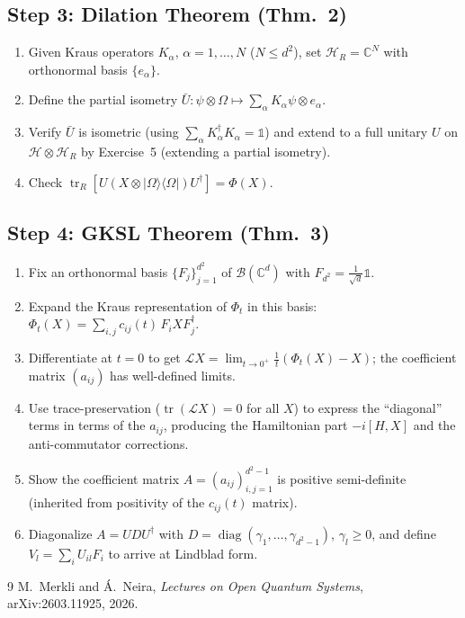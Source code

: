 \documentclass[11pt,a4paper]{article}
\begin{document}
\subsection*{Step 3: Dilation Theorem (Thm.~2)}
\begin{enumerate}[nosep]
  \item Given Kraus operators $K_\alpha$, $\alpha = 1,\dots,N$ ($N \le d^2$), set $\mathcal{H}_R = \mathbb{C}^N$ with orthonormal basis $\{e_\alpha\}$.
  \item Define the partial isometry $\bar{U}: \psi\otimes\Omega \mapsto \sum_\alpha K_\alpha\psi \otimes e_\alpha$.
  \item Verify $\bar{U}$ is isometric (using $\sum_\alpha K_\alpha^\dagger K_\alpha = \mathbb{1}$) and extend to a full unitary $U$ on $\mathcal{H}\otimes\mathcal{H}_R$ by Exercise~5 (extending a partial isometry).
  \item Check $\operatorname{tr}_R[U(X\otimes|\Omega\rangle\langle\Omega|)U^\dagger] = \Phi(X)$.
\end{enumerate}

\subsection*{Step 4: GKSL Theorem (Thm.~3)}
\begin{enumerate}[nosep]
  \item Fix an orthonormal basis $\{F_j\}_{j=1}^{d^2}$ of $\mathcal{B}(\mathbb{C}^d)$ with $F_{d^2} = \frac{1}{\sqrt{d}}\mathbb{1}$.
  \item Expand the Kraus representation of $\Phi_t$ in this basis: $\Phi_t(X) = \sum_{i,j} c_{ij}(t)\, F_i X F_j^\dagger$.
  \item Differentiate at $t=0$ to get $\mathcal{L}X = \lim_{t\to 0^+} \frac{1}{t}(\Phi_t(X) - X)$; the coefficient matrix $(a_{ij})$ has well-defined limits.
  \item Use trace-preservation ($\operatorname{tr}(\mathcal{L}X)=0$ for all $X$) to express the ``diagonal'' terms in terms of the $a_{ij}$, producing the Hamiltonian part $-i[H,X]$ and the anti-commutator corrections.
  \item Show the coefficient matrix $A = (a_{ij})_{i,j=1}^{d^2-1}$ is positive semi-definite (inherited from positivity of the $c_{ij}(t)$ matrix).
  \item Diagonalize $A = U D U^\dagger$ with $D = \operatorname{diag}(\gamma_1,\dots,\gamma_{d^2-1})$, $\gamma_l \ge 0$, and define $V_l = \sum_i U_{il} F_i$ to arrive at Lindblad form.
\end{enumerate}

\begin{thebibliography}{9}
 M.~Merkli and \'A.~Neira, \emph{Lectures on Open Quantum Systems}, arXiv:2603.11925, 2026.
\end{thebibliography}
\end{document}
